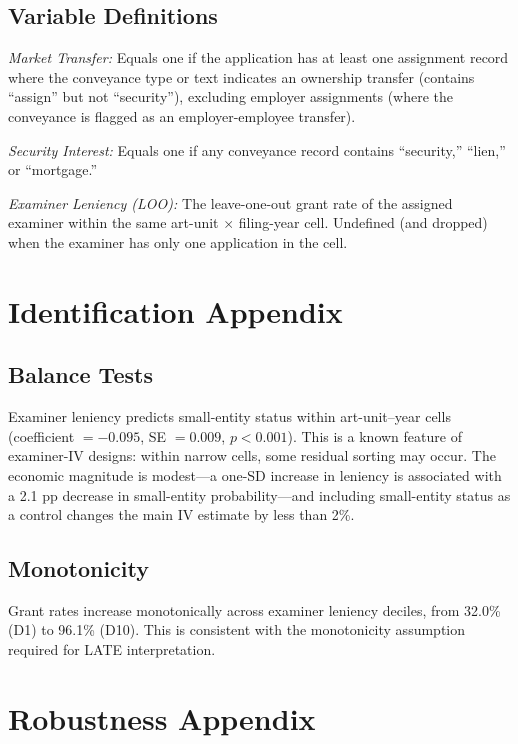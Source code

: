 \documentclass[12pt]{article}
\begin{document}
\subsection{Variable Definitions}

\textit{Market Transfer:} Equals one if the application has at least one assignment record where the conveyance type or text indicates an ownership transfer (contains ``assign'' but not ``security''), excluding employer assignments (where the conveyance is flagged as an employer-employee transfer).

\textit{Security Interest:} Equals one if any conveyance record contains ``security,'' ``lien,'' or ``mortgage.''

\textit{Examiner Leniency (LOO):} The leave-one-out grant rate of the assigned examiner within the same art-unit $\times$ filing-year cell. Undefined (and dropped) when the examiner has only one application in the cell.

\section{Identification Appendix}
\label{sec:id_appendix}

\subsection{Balance Tests}

Examiner leniency predicts small-entity status within art-unit--year cells (coefficient $= -0.095$, SE $= 0.009$, $p < 0.001$). This is a known feature of examiner-IV designs: within narrow cells, some residual sorting may occur. The economic magnitude is modest---a one-SD increase in leniency is associated with a 2.1 pp decrease in small-entity probability---and including small-entity status as a control changes the main IV estimate by less than 2\%.

\subsection{Monotonicity}

Grant rates increase monotonically across examiner leniency deciles, from 32.0\% (D1) to 96.1\% (D10). This is consistent with the monotonicity assumption required for LATE interpretation.

\section{Robustness Appendix}
\label{sec:robust_appendix}
\end{document}
